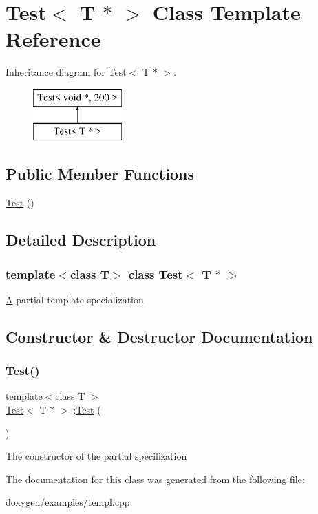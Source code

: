 \hypertarget{class_test_3_01_t_01_5_01_4}{}\section{Test$<$ T $\ast$ $>$ Class Template Reference}
\label{class_test_3_01_t_01_5_01_4}
Inheritance diagram for Test$<$ T $\ast$ $>$\+:\begin{figure}[H]
\begin{center}
\leavevmode
\includegraphics[height=2.000000cm]{class_test_3_01_t_01_5_01_4}
\end{center}
\end{figure}
\subsection*{Public Member Functions}
\begin{DoxyCompactItemize}
\item 
\mbox{\hyperlink{class_test_3_01_t_01_5_01_4_a474e8a1211308b3f810f9eafced6cbe7}{Test}} ()
\end{DoxyCompactItemize}


\subsection{Detailed Description}
\subsubsection*{template$<$class T$>$\newline
class Test$<$ T $\ast$ $>$}

\mbox{\hyperlink{class_a}{A}} partial template specialization 

\subsection{Constructor \& Destructor Documentation}
\mbox{\label{class_test_3_01_t_01_5_01_4_a474e8a1211308b3f810f9eafced6cbe7}} 
\subsubsection{\texorpdfstring{Test()}{Test()}}
{\footnotesize\ttfamily template$<$class T $>$ \\
\mbox{\hyperlink{class_test}{Test}}$<$ T $\ast$ $>$\+::\mbox{\hyperlink{class_test}{Test}} (\begin{DoxyParamCaption}{ }\end{DoxyParamCaption})}

The constructor of the partial specilization 

The documentation for this class was generated from the following file\+:\begin{DoxyCompactItemize}
\item 
doxygen/examples/templ.\+cpp\end{DoxyCompactItemize}
